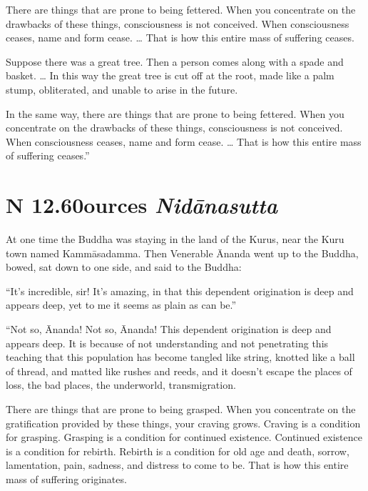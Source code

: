 \documentclass[12pt,openany]{book}%
\newcommand*{\suttatitleacronym}[1]{\smaller[2]{#1}\vspace*{.3em}}
\newcommand*{\suttatitletranslation}[1]{\linebreak{#1}}
\newcommand*{\suttatitleroot}[1]{\linebreak\smaller[2]\itshape{#1}}
\newcommand*{\tocacronym}[1]{\hspace*{-3.3em}{#1}\quad}
\newcommand*{\toctranslation}[1]{#1}
\newcommand*{\tocroot}[1]{(\textit{#1})}
\begin{document}
There are things that are prone to being fettered. When you concentrate on the drawbacks of these things, consciousness is not conceived. When consciousness ceases, name and form cease. … That is how this entire mass of suffering ceases. 

Suppose there was a great tree. Then a person comes along with a spade and basket. … In this way the great tree is cut off at the root, made like a palm stump, obliterated, and unable to arise in the future. 

In the same way, there are things that are prone to being fettered. When you concentrate on the drawbacks of these things, consciousness is not conceived. When consciousness ceases, name and form cease. … That is how this entire mass of suffering ceases.” 

%
\section*{{\suttatitleacronym SN 12.60}{\suttatitletranslation Sources }{\suttatitleroot Nidānasutta}}
\addcontentsline{toc}{section}{\tocacronym{SN 12.60} \toctranslation{Sources } \tocroot{Nidānasutta}}

At one time the Buddha was staying in the land of the Kurus, near the Kuru town named \textsanskrit{Kammāsadamma}. Then Venerable Ānanda went up to the Buddha, bowed, sat down to one side, and said to the Buddha: 

“It’s incredible, sir! It’s amazing, in that this dependent origination is deep and appears deep, yet to me it seems as plain as can be.” 

“Not so, Ānanda! Not so, Ānanda! This dependent origination is deep and appears deep. It is because of not understanding and not penetrating this teaching that this population has become tangled like string, knotted like a ball of thread, and matted like rushes and reeds, and it doesn’t escape the places of loss, the bad places, the underworld, transmigration. 

There are things that are prone to being grasped. When you concentrate on the gratification provided by these things, your craving grows. Craving is a condition for grasping. Grasping is a condition for continued existence. Continued existence is a condition for rebirth. Rebirth is a condition for old age and death, sorrow, lamentation, pain, sadness, and distress to come to be. That is how this entire mass of suffering originates. 
\end{document}
